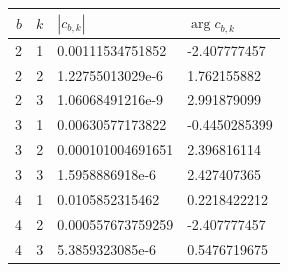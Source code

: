 \begin{tabular}{@{}rrll@{}}
\toprule
$b$ & $k$ & $|c_{b,k}|$ & $\arg c_{b,k}$ \\
\midrule
2 & 1 & 0.00111534751852 & -2.407777457 \\
2 & 2 & 1.22755013029e-6 & 1.762155882 \\
2 & 3 & 1.06068491216e-9 & 2.991879099 \\
3 & 1 & 0.00630577173822 & -0.4450285399 \\
3 & 2 & 0.000101004691651 & 2.396816114 \\
3 & 3 & 1.5958886918e-6 & 2.427407365 \\
4 & 1 & 0.0105852315462 & 0.2218422212 \\
4 & 2 & 0.000557673759259 & -2.407777457 \\
4 & 3 & 5.3859323085e-6 & 0.5476719675 \\
\bottomrule
\end{tabular}
